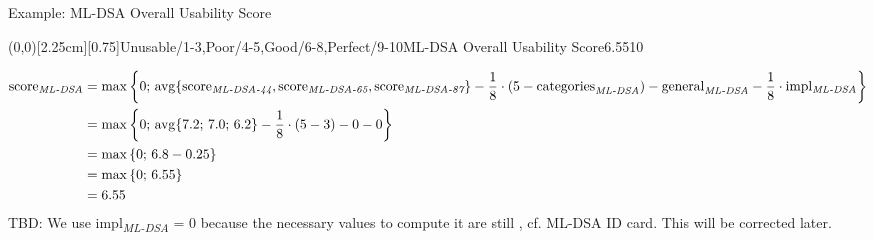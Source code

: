 \documentclass[11pt,english,a4paper, landscape]{scrartcl}
\begin{document}
\begin{algorithmbox}{Example: ML-DSA Overall Usability Score}
		\begin{minipage}[T]{0.25\textwidth}
			\GreenAbsoluteSpeedometer(0,0)[2.25cm][0.75]{Unusable/1-3,Poor/4-5,Good/6-8,Perfect/9-10}{ML-DSA Overall Usability Score}{6.55}{10}{\tiny}{\tiny \montserratsemibold}
		\end{minipage}
		\hfill
		\begin{minipage}[T]{0.75\textwidth}
		\vspace{-\baselineskip}
			\begin{align*}
				\textnormal{score\textsubscript{\itshape ML-DSA}} &= \max\left\{0;\,\operatorname{avg}\{\textnormal{score}_\textnormal{\itshape ML-DSA-44},\textnormal{score}_\textnormal{\itshape ML-DSA-65},\textnormal{score}_\textnormal{\itshape ML-DSA-87}\} - \frac{1}{8}\cdot\left(5-\textnormal{categories}_\textnormal{\itshape ML-DSA}\right) - \textnormal{general}_\textnormal{\itshape ML-DSA} - \frac{1}{8}\cdot\textnormal{impl\textsubscript{\itshape ML-DSA}}\right\}\\
				&=\max\left\{0;\,\operatorname{avg}\{7.2;\,7.0;\,6.2\} - \frac{1}{8}\cdot\left(5-3\right) - 0 - 0\right\}\\
				&=\max\left\{0;\,6.8 - 0.25\right\}\\
				&=\max\left\{0;\,6.55\right\}\\
				&=6.55
			\end{align*}
		\textcolor{themeaccentsecondary}{TBD: We use \textnormal{impl\textsubscript{\itshape ML-DSA}} = 0 because the necessary values to compute it are still \tbd, cf. ML-DSA ID card. This will be corrected later.}\\
		\end{minipage}
	\end{algorithmbox}
\end{document}
